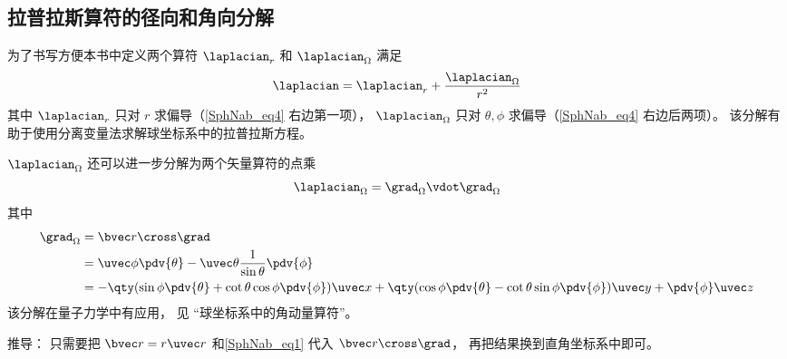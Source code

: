 \subsection{拉普拉斯算符的径向和角向分解}
为了书写方便本书中定义两个算符 $\laplacian_r$ 和 $\laplacian_\Omega$ 满足
\begin{equation}\label{SphNab_eq3}
\laplacian = \laplacian_r + \frac{\laplacian_\Omega}{r^2}
\end{equation}
其中 $\laplacian_r$ 只对 $r$ 求偏导（\autoref{SphNab_eq4} 右边第一项）， $\laplacian_\Omega$ 只对 $\theta,\phi$ 求偏导（\autoref{SphNab_eq4} 右边后两项）。 该分解有助于使用分离变量法求解球坐标系中的拉普拉斯方程。

$\laplacian_\Omega$ 还可以进一步分解为两个矢量算符的点乘
\begin{equation}
\laplacian_\Omega = \grad_\Omega\vdot \grad_\Omega
\end{equation}
其中
\begin{equation}
\begin{aligned}
\grad_\Omega &= \bvec r \cross \grad\\
&= \uvec \phi \pdv{\theta} - \uvec \theta\frac{1}{\sin\theta} \pdv{\phi}\\
&= -\qty(\sin\phi\pdv{\theta} + \cot\theta\cos\phi\pdv{\phi})\uvec x
+ \qty(\cos\phi\pdv{\theta} - \cot\theta \sin\phi \pdv{\phi}) \uvec y
+ \pdv{\phi} \uvec z
\end{aligned}
\end{equation}
该分解在量子力学中有应用， 见 “球坐标系中的角动量算符”。

推导： 只需要把 $\bvec r = r \uvec r$ 和\autoref{SphNab_eq1} 代入 $\bvec r \cross \grad$， 再把结果换到直角坐标系中即可。

